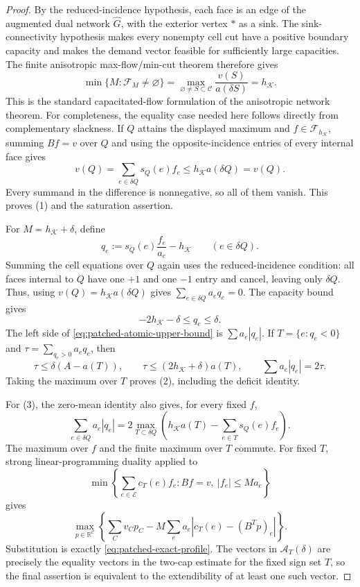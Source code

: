 \begin{proof}
By the reduced-incidence hypothesis, each face is an edge of the augmented
dual network $\widehat G$, with the exterior vertex $\ast$ as a sink. The
sink-connectivity hypothesis makes every nonempty cell cut have a positive
boundary capacity and makes the demand vector feasible for sufficiently large
capacities. The finite anisotropic max-flow/min-cut theorem
\cite{Nozawa1990,Grieser2006,Strang2010} therefore gives
\[
 \min\{M:\mathcal F_M\ne\varnothing\}
 =\max_{\varnothing\ne S\subset\mathcal C}
 \frac{v(S)}{a(\delta S)}=h_{\mathcal K}.
\]
This is the standard capacitated-flow formulation of the anisotropic network
theorem. For completeness, the equality case needed here follows directly
from complementary slackness. If $Q$ attains the displayed maximum and
$f\in\mathcal F_{h_{\mathcal K}}$, summing $Bf=v$ over $Q$ and using the
opposite-incidence entries of every internal face gives
\[
 v(Q)=\sum_{e\in\delta Q}s_Q(e)f_e
 \le h_{\mathcal K}a(\delta Q)=v(Q).
\]
Every summand in the difference is nonnegative, so all of them vanish.  This
proves (1) and the saturation assertion.



For $M=h_{\mathcal K}+\delta$, define
\[
 q_e:=s_Q(e)\frac{f_e}{a_e}-h_{\mathcal K}
 \qquad(e\in\delta Q).
\]
Summing the cell equations over $Q$ again uses the reduced-incidence
condition: all faces internal to $Q$ have one $+1$ and one $-1$ entry and
cancel, leaving only $\delta Q$. Thus, using
$v(Q)=h_{\mathcal K}a(\delta Q)$ gives
$\sum_{e\in\delta Q}a_e q_e=0$.
The capacity bound gives
\[
 -2h_{\mathcal K}-\delta\le q_e\le\delta.
\]
The left side of \eqref{eq:patched-atomic-upper-bound} is
$\sum a_e|q_e|$.  If $T=\{e:q_e<0\}$ and
$\tau=\sum_{q_e>0}a_e q_e$, then
\[
 \tau\le\delta(A-a(T)),
 \qquad
 \tau\le(2h_{\mathcal K}+\delta)a(T),
 \qquad
 \sum a_e|q_e|=2\tau.
\]
Taking the maximum over $T$ proves (2), including the deficit identity.

For (3), the zero-mean identity also gives, for every fixed $f$,
\[
 \sum_{e\in\delta Q}a_e|q_e|
 =2\max_{T\subset\delta Q}
 \left(h_{\mathcal K}a(T)-\sum_{e\in T}s_Q(e)f_e\right).
\]
The maximum over $f$ and the finite maximum over $T$ commute.  For fixed $T$,
strong linear-programming duality \cite{BachemKern1992} applied to
\[
 \min\left\{\sum_{e\in\mathcal E}c_T(e)f_e:
 Bf=v,\ |f_e|\le Ma_e\right\}
\]
gives
\[
 \max_{p\in\mathbb R^{\mathcal C}}
 \left\{\sum_Cv_Cp_C
 -M\sum_ea_e|c_T(e)-(B^Tp)_e|\right\}.
\]
Substitution is exactly \eqref{eq:patched-exact-profile}.  The vectors in
$\mathcal A_T(\delta)$ are precisely the equality vectors in the two-cap
estimate for the fixed sign set $T$, so the final assertion is equivalent to
the extendibility of at least one such vector.


\end{proof}
